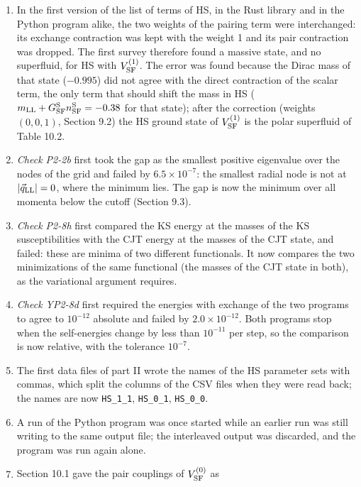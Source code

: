 \documentclass[
  10pt,
]{article}
\providecommand{\tightlist}{%
  \setlength{\itemsep}{0pt}\setlength{\parskip}{0pt}}
\begin{document}
\begin{enumerate}
\def\labelenumi{\arabic{enumi}.}
\tightlist
\item
  In the first version of the list of terms of HS, in the Rust library
  and in the Python program alike, the two weights of the pairing term
  were interchanged: its exchange contraction was kept with the weight 1
  and its pair contraction was dropped. The first survey therefore found
  a massive state, and no superfluid, for HS with \(V^{(1)}_{\rm SF}\).
  The error was found because the Dirac mass of that state (\(-0.995\))
  did not agree with the direct contraction of the scalar term, the only
  term that should shift the mass in HS
  (\(m_{\rm LL}+G^{\rm S}_{\rm SF}n^{\rm S}_{\rm SF}=-0.38\) for that
  state); after the correction (weights \((0,0,1)\), Section 9.2) the HS
  ground state of \(V^{(1)}_{\rm SF}\) is the polar superfluid of Table
  10.2.
\item
  \emph{Check P2-2b} first took the gap as the smallest positive
  eigenvalue over the nodes of the grid and failed by
  \(6.5\times10^{-7}\): the smallest radial node is not at
  \(\lvert\vec q_{\rm LL}\rvert=0\), where the minimum lies. The gap is
  now the minimum over all momenta below the cutoff (Section 9.3).
\item
  \emph{Check P2-8h} first compared the KS energy at the masses of the
  KS susceptibilities with the CJT energy at the masses of the CJT
  state, and failed: these are minima of two different functionals. It
  now compares the two minimizations of the same functional (the masses
  of the CJT state in both), as the variational argument requires.
\item
  \emph{Check YP2-8d} first required the energies with exchange of the
  two programs to agree to \(10^{-12}\) absolute and failed by
  \(2.0\times10^{-12}\). Both programs stop when the self-energies
  change by less than \(10^{-11}\) per step, so the comparison is now
  relative, with the tolerance \(10^{-7}\).
\item
  The first data files of part II wrote the names of the HS parameter
  sets with commas, which split the columns of the CSV files when they
  were read back; the names are now \texttt{HS\_1\_1},
  \texttt{HS\_0\_1}, \texttt{HS\_0\_0}.
\item
  A run of the Python program was once started while an earlier run was
  still writing to the same output file; the interleaved output was
  discarded, and the program was run again alone.
\item
  Section 10.1 gave the pair couplings of \(V^{(0)}_{\rm SF}\) as

\end{enumerate}
\end{document}
